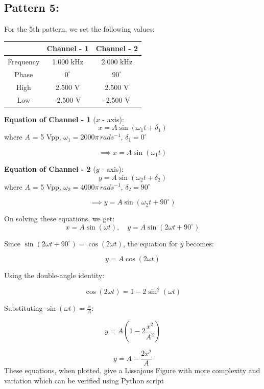 \documentclass[12pt]{article}
\begin{document}
\subsection{Pattern 5:}
For the 5th pattern, we set the following values:
\begin{table}[H]
    \centering
    \begin{tabular}{|c|c|c|}
    \hline
        & \textbf{Channel - 1} & \textbf{Channel - 2}\\
    \hline
    Frequency & 1.000 kHz & 2.000 kHz\\
    \hline
    Phase     & $0^{\circ}$ & $90^{\circ}$\\
    \hline
    High      & 2.500 V & 2.500 V\\
    \hline
    Low       & -2.500 V & -2.500 V\\
    \hline
    \end{tabular}
\end{table}

\textbf{Equation of Channel - 1} ($x$ - axis):
\[
x = A \sin{\left(\omega_1 t + \delta_1\right)}
\]
where $A$ = 5 Vpp, $\omega_1 = 2000 \pi \, rad s^{-1}$, $\delta_1 = 0^{\circ}$

\[
\implies x = A \sin{\left(\omega_1 t\right)}
\]

\textbf{Equation of Channel - 2} ($y$ - axis):
\[
y = A \sin{\left(\omega_2 t + \delta_2\right)}
\]
where $A$ = 5 Vpp, $\omega_2 = 4000 \pi \, rad s^{-1}$, $\delta_2 = 90^{\circ}$

\[
\implies y = A \sin{\left(\omega_2 t + 90^\circ\right)}
\]

On solving these equations, we get:
\[
x = A \sin{\left(\omega t\right)}, \quad y = A \sin{\left(2 \omega t + 90^\circ\right)}
\]

Since \( \sin(2\omega t + 90^\circ) = \cos(2\omega t) \), the equation for \( y \) becomes:

\[
y = A \cos(2\omega t)
\]

Using the double-angle identity:

\[
\cos(2\omega t) = 1 - 2\sin^2(\omega t)
\]

Substituting \( \sin(\omega t) = \frac{x}{A} \):

\[
y = A \left(1 - 2 \frac{x^2}{A^2}\right)
\]

\[
y = A - \frac{2x^2}{A}
\]
These equations, when plotted, give a Lissajous Figure with more complexity and variation which can be verified using Python script
\end{document}
